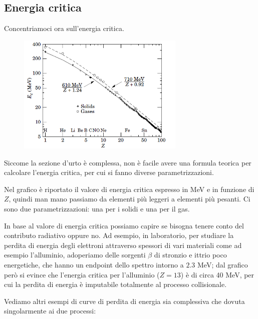 \subsection{Energia critica}
Concentriamoci ora sull'energia critica.

\begin{minipage}{0.495\textwidth}
    \begin{figure}[H]
        \centering
        \includegraphics[width=8cm]{immagini/energia_critica.png}
    \end{figure}
\end{minipage}
\begin{minipage}{0.5\textwidth}
    \vspace{0.3cm}Siccome la sezione d'urto è complessa, non è facile avere una formula teorica per calcolare l'energia critica, per cui si fanno diverse parametrizzazioni.
    
    Nel grafico è riportato il valore di energia critica espresso in MeV e in funzione di $Z$, quindi man mano passiamo da elementi più leggeri a elementi più pesanti. Ci sono due parametrizzazioni: una per i solidi e una per il gas.
\end{minipage}

\vspace{0.3cm}In base al valore di energia critica possiamo capire se bisogna tenere conto del contributo radiativo oppure no. Ad esempio, in laboratorio, per studiare la perdita di energia degli elettroni attraverso spessori di vari materiali come ad esempio l'alluminio, adoperiamo delle sorgenti $\beta$ di stronzio e ittrio poco energetiche, che hanno un endpoint dello spettro intorno a $2.3$ MeV; dal grafico però si evince che l'energia critica per l'alluminio ($Z=13$) è di circa 40 MeV, per cui la perdita di energia è imputabile totalmente al processo collisionale.

Vediamo altri esempi di curve di perdita di energia sia complessiva che dovuta singolarmente ai due processi:

